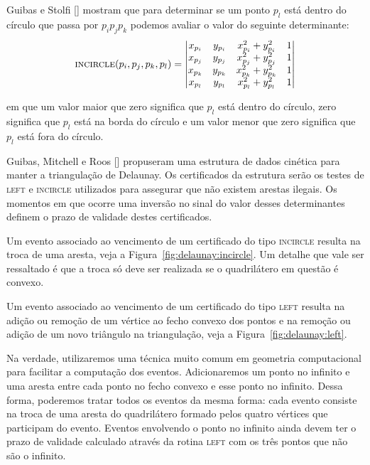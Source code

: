 Guibas e Stolfi [\cite{guibas-stolfi}] mostram que para determinar se um ponto $p_l$ está dentro
do círculo que passa por $p_{i}p_{j}p_{k}$ podemos avaliar o valor do seguinte determinante:
$$\textsc{incircle}(p_i, p_j, p_k, p_l) =
\begin{vmatrix}
    x_{p_i} & y_{p_i} & x_{p_i}^2 + y_{p_i}^2 & 1 \\
    x_{p_j} & y_{p_j} & x_{p_j}^2 + y_{p_j}^2 & 1 \\
    x_{p_k} & y_{p_k} & x_{p_k}^2 + y_{p_k}^2 & 1 \\
    x_{p_l} & y_{p_l} & x_{p_l}^2 + y_{p_l}^2 & 1
\end{vmatrix}$$

em que um valor maior que zero significa que $p_l$ está dentro do círculo, zero significa que $p_l$
está na borda do círculo e um valor menor que zero significa que $p_l$ está fora do círculo.

Guibas, Mitchell e Roos [\cite{guibas-mitchell-roos}] propuseram uma estrutura de dados cinética
para manter a triangulação de Delaunay.
Os certificados da estrutura serão os testes de \textsc{left} e \textsc{incircle} utilizados para
assegurar que não existem arestas ilegais.
Os momentos em que ocorre uma inversão no sinal do valor desses determinantes definem o prazo de
validade destes certificados.

Um evento associado ao vencimento de um certificado do tipo \textsc{incircle} resulta na troca de
uma aresta, veja a Figura~\ref{fig:delaunay:incircle}.
Um detalhe que vale ser ressaltado é que a troca só deve ser realizada se o quadrilátero em
questão é convexo.



Um evento associado ao vencimento de um certificado do tipo \textsc{left} resulta na adição ou
remoção de um vértice ao fecho convexo dos pontos e na remoção ou adição de um novo triângulo na
triangulação, veja a Figura~\ref{fig:delaunay:left}.



Na verdade, utilizaremos uma técnica muito comum em geometria computacional para facilitar a
computação dos eventos.
Adicionaremos um ponto no infinito e uma aresta entre cada ponto no fecho convexo e esse ponto no
infinito.
Dessa forma, poderemos tratar todos os eventos da mesma forma: cada evento consiste na troca de uma
aresta do quadrilátero formado pelos quatro vértices que participam do evento.
Eventos envolvendo o ponto no infinito ainda devem ter o prazo de validade
calculado através da rotina \textsc{left} com os três pontos que não são o infinito.

